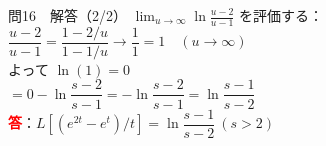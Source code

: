 \documentclass[professionalfonts]{beamer}
\begin{document}
\begin{frame}{問16　解答（2/2）}
  $\displaystyle\lim_{u \to \infty} \ln\frac{u-2}{u-1}$ を評価する：\\[4pt]
  $\dfrac{u-2}{u-1} = \dfrac{1-2/u}{1-1/u} \to \dfrac{1}{1} = 1 \quad (u\to\infty)$\\[4pt]
  よって $\ln(1) = 0$\\[6pt]
  $= 0 - \ln\dfrac{s-2}{s-1} = -\ln\dfrac{s-2}{s-1} = \ln\dfrac{s-1}{s-2}$
  \\[8pt]\textcolor{red}{\textbf{答}}：$L[(e^{2t}-e^{t})/t] = \ln\dfrac{s-1}{s-2} \ (s > 2)$
\end{frame}
\end{document}
